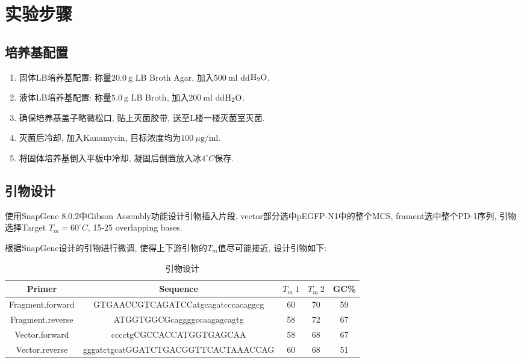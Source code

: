 \documentclass{article}
\begin{document}
\section{实验步骤}

\subsection{培养基配置}

\begin{enumerate}
    \item 固体LB培养基配置: 称量$20.0\ \mbox{g}$ LB Broth Agar, 加入$500\ \mbox{ml}$ dd$\ce{H2O}$.
    \item 液体LB培养基配置: 称量$5.0\ \mbox{g}$ LB Broth, 加入$200\ \mbox{ml}$ dd$\ce{H2O}$.
    \item 确保培养基盖子略微松口, 贴上灭菌胶带, 送至L楼一楼灭菌室灭菌.
    \item 灭菌后冷却, 加入Kanamycin, 目标浓度均为$100\ \mu \mbox{g/ml}$.
    \item 将固体培养基倒入平板中冷却, 凝固后倒置放入冰$4^\circ C$保存.
\end{enumerate}

\subsection{引物设计}

使用SnapGene 8.0.2中Gibson Assembly功能设计引物插入片段, vector部分选中pEGFP-N1中的整个MCS, frament选中整个PD-1序列, 引物选择Target $T_m = 60^\circ C$, 15-25 overlapping bases.

根据SnapGene设计的引物进行微调, 使得上下游引物的$T_m$值尽可能接近, 设计引物如下:
\begin{table}[htbp]
    \centering
    \begin{tabular}{ccccc}
        \toprule
        Primer & Sequence & $T_m\ 1$ & $T_m\ 2$ & GC\% \\
        \midrule
        Fragment.forward & GTGAACCGTCAGATCCatgcagatcccacaggcg  & 60  & 70  & 59  \\
        Fragment.reverse & ATGGTGGCGcaggggccaagagcagtg  & 58  & 72  & 67  \\
        Vector.forward & cccctgCGCCACCATGGTGAGCAA  & 58  & 68  & 67  \\
        Vector.reverse & gggatctgcatGGATCTGACGGTTCACTAAACCAG  & 60  & 68  & 51  \\
        \bottomrule
    \end{tabular}
    \caption{引物设计}
\end{table}
\end{document}
